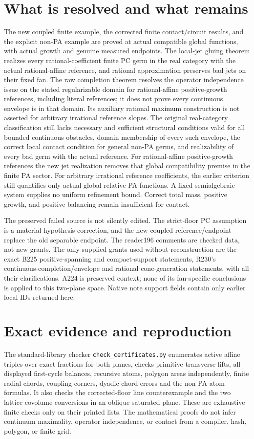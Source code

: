 \documentclass[11pt]{article}
\begin{document}
\section{What is resolved and what remains}
The new coupled finite example, the corrected finite contact/circuit
results, and the explicit non-PA example are proved at actual compatible
global functions, with actual growth and genuine measured endpoints.
The local-jet gluing theorem realizes every rational-coefficient finite
PC germ in the real category with the actual rational-affine reference,
and rational approximation preserves bad jets on their fixed fan.
The raw completion theorem resolves the operator independence issue
on the stated regularizable domain for rational-affine positive-growth
references, including literal references; it does not prove every
continuous envelope is in that domain. Its auxiliary rational maximum
construction is not asserted for arbitrary irrational reference slopes.
The original real-category classification still lacks necessary and
sufficient structural conditions valid for all bounded continuous
obstacles, domain membership of every such envelope, the correct local
contact condition for general non-PA germs, and realizability of every
bad germ with the actual reference. For rational-affine positive-growth references the new jet realization
removes that global compatibility premise in the finite PA sector.
For arbitrary irrational reference coefficients, the earlier criterion
still quantifies only actual global relative PA functions. A fixed semialgebraic system
supplies no uniform refinement bound. Correct total mass, positive
growth, and positive balancing remain insufficient for contact.

The preserved failed source is not silently edited. The strict-floor
PC assumption is a material hypothesis correction, and the new coupled
reference/endpoint replace the old separable endpoint. The reader196
comments are checked data, not new grants. The only supplied grants
used without reconstruction are the exact B225 positive-spanning and
compact-support statements, R230's continuous-completion/envelope and
rational cone-generation statements, with all their clarifications.
A224 is preserved context; none of its fan-specific conclusions is
applied to this two-plane space. Native note support fields contain
only earlier local IDs returned here.

\section{Exact evidence and reproduction}
The standard-library checker \texttt{check\_certificates.py} enumerates
active affine triples over exact fractions for both planes, checks
primitive transverse lifts, all displayed first-cycle balances, recursive
atoms, polygon areas independently, finite radial chords, coupling
corners, dyadic chord errors and the non-PA atom formulas. It also
checks the corrected-floor line counterexample and the two lattice
covolume conversions in an oblique saturated plane. These are exhaustive
finite checks only on their printed lists. The mathematical proofs do
not infer continuum maximality, operator independence, or contact from
a compiler, hash, polygon, or finite grid.
\end{document}

